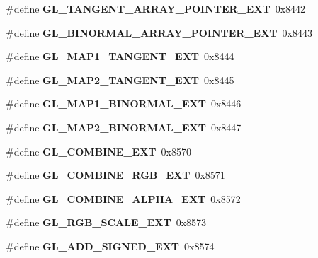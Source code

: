 \begin{DoxyCompactItemize}
\item 
\#define {\bfseries G\+L\+\_\+\+T\+A\+N\+G\+E\+N\+T\+\_\+\+A\+R\+R\+A\+Y\+\_\+\+P\+O\+I\+N\+T\+E\+R\+\_\+\+E\+X\+T}~0x8442\label{_s_d_l__opengl_8h_ac235b4e03754dd3f0821aaab648f459c}

\item 
\#define {\bfseries G\+L\+\_\+\+B\+I\+N\+O\+R\+M\+A\+L\+\_\+\+A\+R\+R\+A\+Y\+\_\+\+P\+O\+I\+N\+T\+E\+R\+\_\+\+E\+X\+T}~0x8443\label{_s_d_l__opengl_8h_aaeb8c26a9ac4deb2f0c85ebc72f3a246}

\item 
\#define {\bfseries G\+L\+\_\+\+M\+A\+P1\+\_\+\+T\+A\+N\+G\+E\+N\+T\+\_\+\+E\+X\+T}~0x8444\label{_s_d_l__opengl_8h_a10c45c2b23bc4c0ed4b47a4de4294349}

\item 
\#define {\bfseries G\+L\+\_\+\+M\+A\+P2\+\_\+\+T\+A\+N\+G\+E\+N\+T\+\_\+\+E\+X\+T}~0x8445\label{_s_d_l__opengl_8h_ac64fa80b18ad1f5ef2c618adacf6a000}

\item 
\#define {\bfseries G\+L\+\_\+\+M\+A\+P1\+\_\+\+B\+I\+N\+O\+R\+M\+A\+L\+\_\+\+E\+X\+T}~0x8446\label{_s_d_l__opengl_8h_a792b15dc5376e1b3ae33fbf8ee9248bd}

\item 
\#define {\bfseries G\+L\+\_\+\+M\+A\+P2\+\_\+\+B\+I\+N\+O\+R\+M\+A\+L\+\_\+\+E\+X\+T}~0x8447\label{_s_d_l__opengl_8h_a61d6839eb30ea52d7277cfa1c333246e}

\item 
\#define {\bfseries G\+L\+\_\+\+C\+O\+M\+B\+I\+N\+E\+\_\+\+E\+X\+T}~0x8570\label{_s_d_l__opengl_8h_a2e273069e7699f4ff1d1351497ff6a00}

\item 
\#define {\bfseries G\+L\+\_\+\+C\+O\+M\+B\+I\+N\+E\+\_\+\+R\+G\+B\+\_\+\+E\+X\+T}~0x8571\label{_s_d_l__opengl_8h_af159195a87191c457a6f6b3ba5a6aa11}

\item 
\#define {\bfseries G\+L\+\_\+\+C\+O\+M\+B\+I\+N\+E\+\_\+\+A\+L\+P\+H\+A\+\_\+\+E\+X\+T}~0x8572\label{_s_d_l__opengl_8h_a255c21d2b3063606504b0beec5c8e2d6}

\item 
\#define {\bfseries G\+L\+\_\+\+R\+G\+B\+\_\+\+S\+C\+A\+L\+E\+\_\+\+E\+X\+T}~0x8573\label{_s_d_l__opengl_8h_ab6c506cf91e2a11ebb34c86d51cfd804}

\item 
\#define {\bfseries G\+L\+\_\+\+A\+D\+D\+\_\+\+S\+I\+G\+N\+E\+D\+\_\+\+E\+X\+T}~0x8574\label{_s_d_l__opengl_8h_a99a413f92f5d7f48eac150313e9c14fd}


\end{DoxyCompactItemize}
